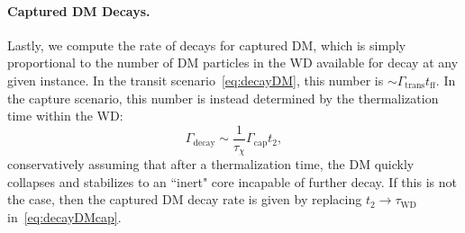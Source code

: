 \paragraph{Captured DM Decays.}
Lastly, we compute the rate of decays for captured DM, which is simply proportional to the number of DM particles in the WD available for decay at any given instance.
In the transit scenario~\eqref{eq:decayDM}, this number is $\sim \Gamma_\text{trans} t_\text{ff}$.
In the capture scenario, this number is instead determined by the thermalization time within the WD:
\begin{equation}
\Gamma_\text{decay} \sim  \frac{1}{\tau_\chi} \Gamma_\text{cap} t_2,
\label{eq:decayDMcap}
\end{equation}
conservatively assuming that after a thermalization time, the DM quickly collapses and stabilizes to an ``inert" core incapable of further decay.
If this is not the case, then the captured DM decay rate is given by replacing $t_2 \to \tau_\text{WD}$ in~\eqref{eq:decayDMcap}.
